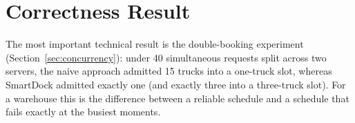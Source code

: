 \section{Correctness Result}
The most important technical result is the double-booking experiment (Section~\ref{sec:concurrency}): under 40 simultaneous requests split across two servers, the naive approach admitted 15 trucks into a one-truck slot, whereas SmartDock admitted exactly one (and exactly three into a three-truck slot). For a warehouse this is the difference between a reliable schedule and a schedule that fails exactly at the busiest moments.

